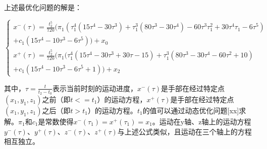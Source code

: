 上述最优化问题的解是：

\begin{equation}
	\begin{cases}
		x^{-}(\tau)=\frac{t_2^5}{720}(\pi_1(\tau_1^4(15\tau^4-30\tau^3)+\tau_1^3(80\tau^3-30\tau^4)-60\tau^3\tau_1^2+30\tau^4\tau_1-6\tau^5) \\ +c_1(15\tau^4-10\tau^3-6\tau^5))+x_0 \\
		x^{+}(\tau)=\frac{t_2^5}{720}(\pi_1(\tau_1^4(15\tau^4-30\tau^3+30\tau-15)+\tau_1^3(80\tau^3-30\tau^4-60\tau^2+10) \\ +c_1(15\tau^4-10\tau^3-6\tau^5+1))+x_2
	\end{cases}
\end{equation}

其中，$\tau=\frac{t}{t_2-t_0}$表示当前时刻的运动进度，$x^{-}(\tau)$是手部在经过特定点$(x_1, y_1, z_1)$之前（即$t<=t_1$）的运动方程，$x^{+}(\tau)$是手部在经过特定点$(x_1, y_1, z_1)$之后（即$t>t_1$）的运动方程。$t_1$的值可以通过动态优化问题[xx]求解。$\pi_1$和$c_1$是常数使得$x^{-}(\tau_1)=x^{+}(\tau_1)=x_1$。运动在y轴、z轴上的运动方程$y^{-}(\tau)$、$y^{+}(\tau)$、$z^{-}(\tau)$、$z^{+}(\tau)$与上述公式类似，且运动在三个轴上的方程相互独立。

\fi

